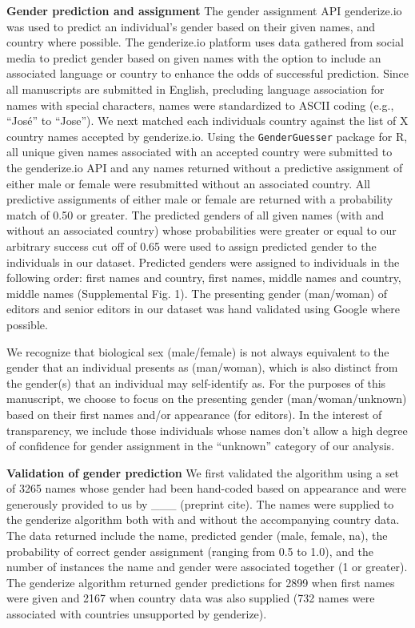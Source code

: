 \documentclass[11pt,]{article}
\begin{document}
\textbf{Gender prediction and assignment} The gender assignment API
genderize.io was used to predict an individual's gender based on their
given names, and country where possible. The genderize.io platform uses
data gathered from social media to predict gender based on given names
with the option to include an associated language or country to enhance
the odds of successful prediction. Since all manuscripts are submitted
in English, precluding language association for names with special
characters, names were standardized to ASCII coding (e.g., ``José'' to
``Jose''). We next matched each individuals country against the list of
X country names accepted by genderize.io. Using the
\texttt{GenderGuesser} package for R, all unique given names associated
with an accepted country were submitted to the genderize.io API and any
names returned without a predictive assignment of either male or female
were resubmitted without an associated country. All predictive
assignments of either male or female are returned with a probability
match of 0.50 or greater. The predicted genders of all given names (with
and without an associated country) whose probabilities were greater or
equal to our arbitrary success cut off of 0.65 were used to assign
predicted gender to the individuals in our dataset. Predicted genders
were assigned to individuals in the following order: first names and
country, first names, middle names and country, middle names
(Supplemental Fig. 1). The presenting gender (man/woman) of editors and
senior editors in our dataset was hand validated using Google where
possible.

We recognize that biological sex (male/female) is not always equivalent
to the gender that an individual presents as (man/woman), which is also
distinct from the gender(s) that an individual may self-identify as. For
the purposes of this manuscript, we choose to focus on the presenting
gender (man/woman/unknown) based on their first names and/or appearance
(for editors). In the interest of transparency, we include those
individuals whose names don't allow a high degree of confidence for
gender assignment in the ``unknown'' category of our analysis.

\textbf{Validation of gender prediction} We first validated the
algorithm using a set of 3265 names whose gender had been hand-coded
based on appearance and were generously provided to us by \_\_\_
(preprint cite). The names were supplied to the genderize algorithm both
with and without the accompanying country data. The data returned
include the name, predicted gender (male, female, na), the probability
of correct gender assignment (ranging from 0.5 to 1.0), and the number
of instances the name and gender were associated together (1 or
greater). The genderize algorithm returned gender predictions for 2899
when first names were given and 2167 when country data was also supplied
(732 names were associated with countries unsupported by genderize).
\end{document}
